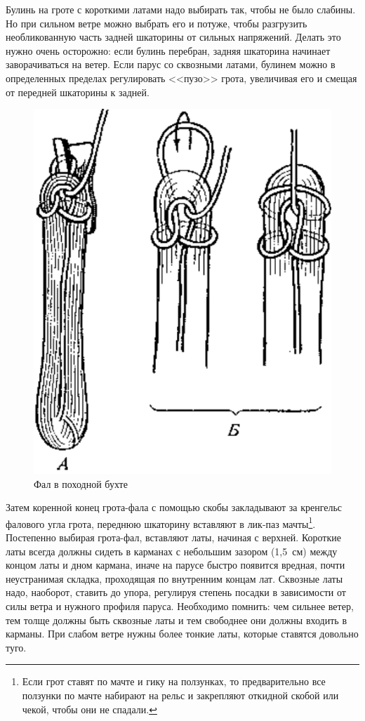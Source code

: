 \documentclass[a4paper, 12pt, twoside, final]{scrbook}
\begin{document}
Булинь на гроте с короткими латами надо выбирать так, чтобы не было слабины. Но при сильном ветре можно выбрать его и потуже, чтобы разгрузить необликованную часть задней шкаторины от сильных напряжений. Делать это нужно очень осторожно: если булинь перебран, задняя шкаторина начинает заворачиваться на ветер. Если парус со сквозными латами, булинем можно в определенных пределах регулировать <<пузо>> грота, увеличивая его и смещая от передней шкаторины к задней.


\begin{figure}
	\centering
	\includegraphics[scale=1]{103_Fal_v_pohodnoj_buhte}
	\caption{Фал в походной бухте}
	\label{fig:103}
\end{figure}

Затем коренной конец грота-фала с помощью скобы закладывают за кренгельс фалового угла грота, переднюю шкаторину вставляют в лик-паз мачты\footnote{Если грот ставят по мачте и гику на ползунках, то предварительно все ползунки по мачте набирают на рельс и закрепляют откидной скобой или чекой, чтобы они не спадали.}. Постепенно выбирая грота-фал, вставляют латы, начиная с верхней. Короткие латы всегда должны сидеть в карманах с небольшим зазором (1,5~см) между концом латы и дном кармана, иначе на парусе быстро появится вредная, почти неустранимая складка, проходящая по внутренним концам лат. Сквозные латы надо, наоборот, ставить до упора, регулируя степень посадки в зависимости от силы ветра и нужного профиля паруса. Необходимо помнить: чем сильнее ветер, тем толще должны быть сквозные латы и тем свободнее они должны входить в карманы. При слабом ветре нужны более тонкие латы, которые ставятся довольно туго.
\end{document}
